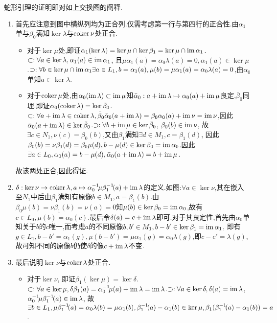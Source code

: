 \documentclass[11pt]{article} %
\begin{document}
\small
蛇形引理的证明即对如上交换图的阐释.
\begin{enumerate}
    \item 首先应注意到图中横纵列均为正合列.仅需考虑第一行与第四行的正合性.由$\alpha_1$单与$\beta_0$满知$\ker\lambda$与$\operatorname{coker}\nu$处正合.
    \begin{itemize}
        \item 对于$\ker\mu$处,即证$\alpha_1(\ker\lambda)=\ker\mu\cap \ker\beta_1=\ker\mu\cap \operatorname{im} \alpha_1$.$\subset: \forall a\in \ker\lambda, \alpha_1(a)\in \operatorname{im}\alpha_1$, 且$\mu\alpha_1(a)=\alpha_0 \lambda(a)=0, \alpha_1(a)\in \ker\mu$.$\supset: \forall b\in \ker\mu\cap \operatorname{im}\alpha_1 \exists a\in L_1, b=\alpha_1(a), \mu(b)=\mu\alpha_1(a)=\alpha_0\lambda(a)=0$,由$\alpha_0$单知$a\in\ker\lambda$.
        \item 对于$\operatorname{coker}\mu$处,由$\alpha_0(\operatorname{im}\lambda)\subset \operatorname{im}\mu$知$\bar{\alpha}_0:a+\operatorname{im}\lambda\mapsto \alpha_0(a)+\operatorname{im}\mu$良定,$\bar{\beta}_0$同理.即证$\bar{\alpha}_0(\operatorname{coker}\lambda)=\ker\bar{\beta}_0$.$\subset: \forall a+\operatorname{im}\lambda\in\operatorname{coker}\lambda, \bar{\beta}_0\bar{\alpha}_0(a+\operatorname{im}\lambda)=\beta_0\alpha_0(a)+\operatorname{im}\nu=\operatorname{im}\nu$,因此$\bar{\alpha}_0(a+\operatorname{im}\lambda)\in \ker\bar{\beta}_0$.$\supset: \forall b+\operatorname{im}\mu\in\ker\bar{\beta}_0$, $\beta_0(b)\in\operatorname{im}\nu$, 故$\exists c\in N_1, \nu(c)=\beta_0(b)$,又由$\beta_1$满知$\exists d\in M_1, c=\beta_1(d)$, 因此$\beta_0(b)=\nu\beta_1(d)=\beta_0\mu(d), b-\mu(d)\in\ker\beta_0=\operatorname{im}\alpha_0$.因此$\exists a\in L_0, \alpha_0(a)=b-\mu(d), \bar{\alpha}_0(a+\operatorname{im}\lambda)=b+\operatorname{im}\mu$.
    \end{itemize}
    故该两处正合,因此得证.
    \item $\delta:\ker\nu\to\operatorname{coker}\lambda, a\mapsto \alpha_0^{-1}\! \mu\beta_1^{-1}\!(a)+\operatorname{im}\lambda$的定义.如图:$\forall a\in\ker\nu$,其在嵌入至$N_1$中后由$\beta_1$满知有原像$b\in M_1, a=\beta_1(b)$.由$\beta_0\mu(b)=\nu\beta_1(b)=\nu(a)=0$知$\mu(b)\in\ker\beta_0=\operatorname{im}\alpha_0$,故有$c\in L_0, \mu(b)=\alpha_0(c)$.最后令$\delta(a)=c+\operatorname{im}\lambda$即可.对于其良定性,首先由$\alpha_0$单知关于$b$的$c$唯一,而考虑$a$的不同原像$b,b'\in M_1, b-b'\in\ker\beta_1=\operatorname{im}\alpha_1$, 即有$g\in L_1, b-b'=\alpha_1(g), \mu(b-b')=\mu\alpha_1(g)=\alpha_0\lambda(g)$,即$c-c'=\lambda(g)$,故可知不同的原像$b$仍使$\delta$的像$c+\operatorname{im}\lambda$不变.
    \item 最后说明$\ker\nu$与$\operatorname{coker}\lambda$处正合.
    \begin{itemize}
        \item 对于$\ker\nu$, 即证$\beta_1(\ker\mu)=\ker\delta$.$\subset: \forall a\in \ker\mu, \delta\beta_1(a)=\alpha_0^{-1}\!\mu(a)+\operatorname{im}\lambda=\operatorname{im} \lambda$.$\supset: \forall a\in \ker\delta, \delta(a)=\operatorname{im}\lambda$, $\alpha_0^{-1}\! \mu\beta_1^{-1}\!(a)\in \operatorname{im}\lambda$, 故$\exists b\in L_1, \mu\beta_1^{-1}\!(a)=\alpha_0\lambda(b)=\mu\alpha_1(b), \beta_1^{-1}\!(a)-\alpha_1(b)\in\ker\mu, \beta_1(\beta_1^{-1}\!(a)-\alpha_1(b))=a$.

\end{itemize}
\end{enumerate}
\end{document}
